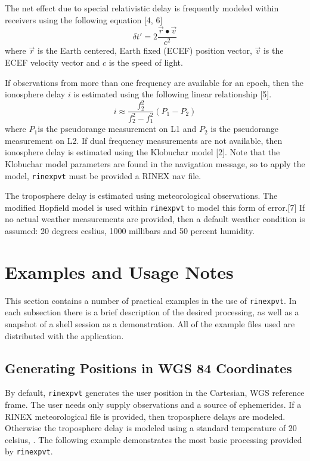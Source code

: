 The net effect due to special relativistic delay is frequently modeled within
receivers using the following equation [4, 6]
\begin{equation}
  \delta t' = 2 \frac{\vec{r} \bullet \vec{v}}{c^2}
\end{equation}
where $\vec{r}$ is the Earth centered, Earth fixed (ECEF) position vector,
$\vec{v}$ is the ECEF velocity vector and $c$ is the speed of light.

If observations from more than one frequency are available for an epoch, then
the ionosphere delay $i$ is estimated using the following linear relationship
[5].
\begin{equation}
  i \approx \frac{f_2^2}{f_2^2 - f_1^2} ( P_1 - P_2 )
\end{equation}
where $P_1 $is the pseudorange measurement on L1 and $P_2$ is the pseudorange
measurement on L2. If dual frequency measurements are not available, then
ionosphere delay is estimated using the Klobuchar model [2]. Note that the
Klobuchar model parameters are found in the navigation message, so to apply
the model, \texttt{rinexpvt} must be provided a RINEX nav file.

The troposphere delay is estimated using meteorological observations. The
modified Hopfield model is used within \texttt{rinexpvt} to model this form of
error.[7] If no actual weather measurements are provided, then a default
weather condition is assumed: 20 degrees ceslius, 1000 millibars and 50
percent humidity.

\section{Examples and Usage Notes}

This section contains a number of practical examples in the use of
\texttt{rinexpvt}. In each subsection there is a brief description of the
desired processing, as well as a snapshot of a shell session as a
demonstration. All of the example files used are distributed with the
application.

\subsection{Generating Positions in WGS 84 Coordinates}

By default, \texttt{rinexpvt} generates the user position in the Cartesian,
WGS reference frame. The user needs only supply observations and a source of
ephemerides. If a RINEX meteorological file is provided, then troposphere
delays are modeled. Otherwise the troposphere delay is modeled using a
standard temperature of 20 celsius, . The following example demonstrates the
most basic processing provided by \texttt{rinexpvt}.

